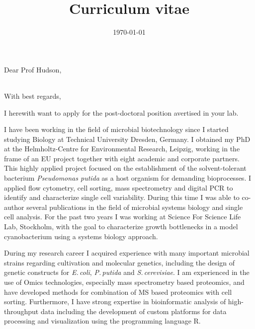 \documentclass[11pt, a4paper, sans, blue]{moderncv}
\title{Curriculum vitae}
\begin{document}
\clearpage
\thispagestyle{empty}
\date{\today} %
\opening{Dear Prof Hudson,} %
\closing{\\ With best regards,} %

\makelettertitle %
\justifying

I herewith want to apply for the post-doctoral position avertised in your lab.

I have been working in the field of microbial biotechnology since I started studying Biology at Technical University Dresden, Germany. I obtained my PhD at the Helmholtz-Centre for Environmental Research, Leipzig, working in the frame of an EU project together with eight academic and corporate partners. This highly applied project focused on the establishment of the solvent-tolerant bacterium \textit{Pseudomonas putida} as a host organism for demanding bioprocesses. I applied flow cytometry, cell sorting, mass spectrometry and digital PCR to identify and characterize single cell variability. During this time I was able to co-author several publications in the field of microbial systems biology and single cell analysis. For the past two years I was working at Science For Science Life Lab, Stockholm, with the goal to characterize growth bottlenecks in a model cyanobacterium using a systems biology approach. 
 
During my research career I acquired experience with many important microbial strains regarding cultivation and molecular genetics, including the design of genetic constructs for \textit{E.\,coli}, \textit{P.\,putida} and \textit{S.\,cerevisiae}. I am experienced in the use of Omics technologies, especially mass spectrometry based proteomics, and have developed methods for combination of MS based proteomics with cell sorting. Furthermore, I have strong expertise in bioinformatic analysis of high-throughput data including the development of custom platforms for data processing and visualization using the programming language R. 
\end{document}
